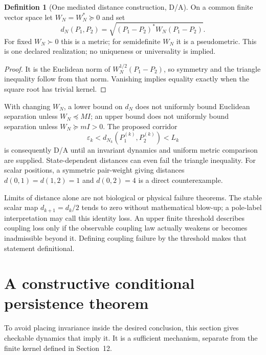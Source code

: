 \documentclass[11pt,letterpaper]{article}
\theoremstyle{definition}
\newtheorem{definition}[theorem]{Definition}
\numberwithin{equation}{section}
\begin{document}
\begin{definition}[One mediated distance construction, D/A]\label{distance}
On a common finite vector space let $W_N=W_N^*\succeq0$ and set
\begin{equation}
d_N(P_1,P_2)=\sqrt{(P_1-P_2)^*W_N(P_1-P_2)}.
\end{equation}
For fixed $W_N\succ0$ this is a metric; for semidefinite $W_N$ it is a pseudometric. This is one declared realization; no uniqueness or universality is implied.
\end{definition}
\begin{proof}
It is the Euclidean norm of $W_N^{1/2}(P_1-P_2)$, so symmetry and the triangle inequality follow from that norm. Vanishing implies equality exactly when the square root has trivial kernel.
\end{proof}
With changing $W_N$, a lower bound on $d_N$ does not uniformly bound Euclidean separation unless $W_N\preceq MI$; an upper bound does not uniformly bound separation unless $W_N\succeq mI>0$. The proposed corridor
\begin{equation}\label{corridor}
\varepsilon_k<d_{N_k}(P_1^{(k)},P_2^{(k)})<L_k
\end{equation}
is consequently D/A until an invariant dynamics and uniform metric comparison are supplied. State-dependent distances can even fail the triangle inequality. For scalar positions, a symmetric pair-weight giving distances $d(0,1)=d(1,2)=1$ and $d(0,2)=4$ is a direct counterexample.

Limits of distance alone are not biological or physical failure theorems. The stable scalar map $d_{k+1}=d_k/2$ tends to zero without mathematical blow-up; a pole-label interpretation may call this identity loss. An upper finite threshold describes coupling loss only if the observable coupling law actually weakens or becomes inadmissible beyond it. Defining coupling failure by the threshold makes that statement definitional.

\section{A constructive conditional persistence theorem}
To avoid placing invariance inside the desired conclusion, this section gives checkable dynamics that imply it. It is a sufficient mechanism, separate from the finite kernel defined in Section~12.
\end{document}
